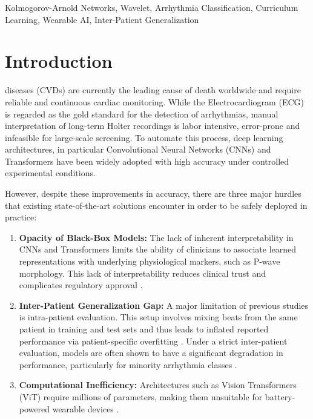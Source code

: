 \documentclass[journal,twoside,web]{ieeecolor}
\begin{document}
\begin{IEEEkeywords}
Kolmogorov-Arnold Networks, Wavelet, Arrhythmia Classification, Curriculum Learning, Wearable AI, Inter-Patient Generalization
\end{IEEEkeywords}

\section{Introduction}

 diseases (CVDs) are currently the leading cause of death worldwide and require reliable and continuous cardiac monitoring. While the Electrocardiogram (ECG) is regarded as the gold standard for the detection of arrhythmias, manual interpretation of long-term Holter recordings is labor intensive, error-prone and infeasible for large-scale screening. To automate this process, deep learning architectures, in particular Convolutional Neural Networks (CNNs) \cite{takalo-mattila_inter-patient_2018, guo_inter-patient_2019} and Transformers \cite{akan_ecgformer_2024} have been widely adopted with high accuracy under controlled experimental conditions.

However, despite these improvements in accuracy, there are three major hurdles that existing state-of-the-art solutions encounter in order to be safely deployed in practice: 

\begin{enumerate}
    \item \textbf{Opacity of Black-Box Models:} The lack of inherent interpretability in CNNs and Transformers limits the ability of clinicians to associate learned representations with underlying physiological markers, such as P-wave morphology. This lack of interpretability reduces clinical trust and complicates regulatory approval \cite{taleban_explainable_2026}. 
    \item \textbf{Inter-Patient Generalization Gap:} A major limitation of previous studies is intra-patient evaluation. This setup involves mixing beats from the same patient in training and test sets and thus leads to inflated reported performance via patient-specific overfitting \cite{bahrami_investigation_2025}. Under a strict inter-patient evaluation, models are often shown to have a significant degradation in performance, particularly for minority arrhythmia classes \cite{xiao_deep_2023, silva_systematic_2025}.
    \item \textbf{Computational Inefficiency:} Architectures such as Vision Transformers (ViT) require millions of parameters, making them unsuitable for battery-powered wearable devices \cite{elsheikhy_lightweight_2025}.
\end{enumerate}
\end{document}
